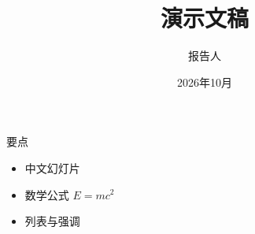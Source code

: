 \documentclass{ctexbeamer}
\title{演示文稿}
\author{报告人}
\date{2026年10月}
\begin{document}
\begin{frame}\titlepage\end{frame}
\begin{frame}{要点}
\begin{itemize}
\item 中文幻灯片
\item 数学公式 $E=mc^2$
\item 列表与\alert{强调}
\end{itemize}
\end{frame}
\end{document}
